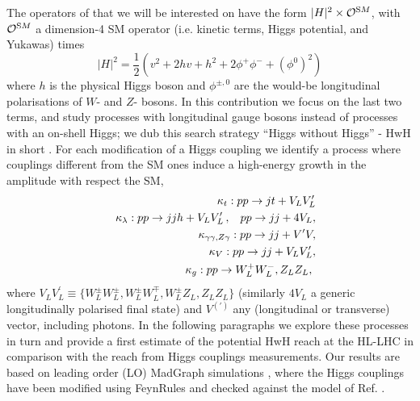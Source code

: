 The operators of that we will be interested on have the form $|H|^2\times \mathcal{O}^{\mathrm SM}$, with $\mathcal{O}^{\mathrm SM}$ a dimension-4  SM operator (i.e. kinetic terms, Higgs potential, and Yukawas) times
\begin{equation}
|H|^2=\frac{1}{2}\left(v^2+ 2 hv + h^2+2\phi^+\phi^-+(\phi^0)^2\right)
\end{equation}
where $h$ is the physical Higgs boson and $\phi^{\pm,0}$ are the would-be longitudinal polarisations of $W$- and $Z$- bosons.
In this contribution we focus on the last two terms, and study processes with longitudinal gauge bosons instead of processes with an on-shell Higgs; we dub this search strategy ``Higgs without Higgs''  - HwH in short \cite{Henning:2018kys}.  
%
For each modification of a Higgs coupling we identify a process where couplings different from the SM ones induce a high-energy growth in the amplitude with respect the SM,
\begin{eqnarray}
&&\kappa_t: p p \to j t+ V_LV^\prime_L\label{prockt}\\
&&\kappa_\lambda:  p p \to  j j h + V_LV^\prime_L\,,\hspace{.3cm}p p \to jj+4V_L, \label{prockh36}\\
 &&\kappa_{\gamma\gamma,Z\gamma}:  p p \to j j +V^\prime V,\label{prockga} \\ 
&&\kappa_V:  p p \to jj+V_LV^\prime_L,\label{prockv}\\
&&\kappa_g:  p p \to W_L^+W_L^-, Z_LZ_L ,\ \label{prockg}
\end{eqnarray} 
where $V_LV^\prime_L\equiv\{W_L^\pm W_L^\pm,W_L^\pm W_L^\mp,W_L^\pm Z_L,Z_LZ_L\}$ (similarly $4V_L$ a generic longitudinally polarised final state) and $V^{(\prime)}$ any (longitudinal or transverse) vector, including photons.
In the following paragraphs we explore these processes in turn and provide a first estimate of the potential HwH reach at the HL-LHC in comparison with the reach from Higgs couplings measurements. 
Our results are based on leading order (LO) MadGraph simulations \cite{Alwall:2014hca}, where the Higgs couplings have been modified using FeynRules \cite{Christensen:2008py} and checked against the model of Ref. \cite{Falkowski:2015wza}.

 


